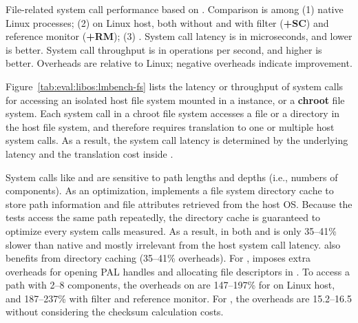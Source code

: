 \label{sec:eval:libos:fs}


\begin{table}[t!b!]

\caption{File-related system call performance based on \lmbench{}. 
Comparison is among (1) native Linux processes; (2) \graphene{} on Linux host, both without and with \seccomp{} filter ({\bf +SC}) and reference monitor ({\bf +RM}); (3) \graphenesgx{}.
System call latency is in microseconds, and lower is better.
System call throughput is in operations per second, and higher is better. 
Overheads are relative to Linux; negative overheads indicate improvement.} 
\label{tab:eval:libos:lmbench-fs}
\end{table}



Figure~\ref{tab:eval:libos:lmbench-fs}
lists the latency or throughput of system calls
for accessing an isolated host file system mounted in a \thelibos{} instance,
or a {\bf chroot} file system.
Each system call in a chroot file system
accesses a file or a directory in the host file system,
and therefore requires
translation to one or multiple
host system calls.
As a result, the system call latency
is determined by the underlying \hostapi{} latency and the translation cost inside \thelibos{}.



System calls like  and 
are sensitive to path lengths and depths (i.e., numbers of components).
As an optimization,
\thelibos{} implements a file system directory cache
to store path information and file attributes retrieved from the host OS.
Because the \lmbench{} tests %
access the same path repeatedly,
the directory cache
is guaranteed to optimize every system calls measured.
As a result,
 in both \graphene{} and \graphenesgx{} is only 35--41\% slower than native
and mostly irrelevant from the host system call latency. 
 also benefits from directory caching
(35--41\% overheads).
For , %
\graphene{} imposes
extra overheads for opening PAL handles and allocating file descriptors in \thelibos{}.
To access a path with 2--8 components,
the overheads on  are 147--197\% for \graphene{} on Linux host, and 187--237\% with \seccomp{} filter and reference monitor.
For \graphenesgx{}, the overheads are 15.2--16.5\x{}
without considering the checksum calculation costs.


